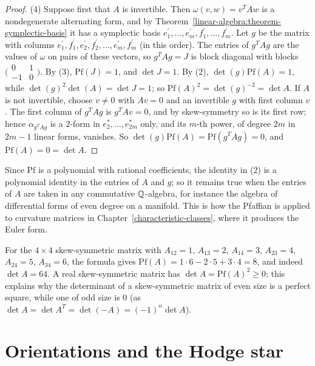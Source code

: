 \begin{proof}
(4) Suppose first that $A$ is invertible. Then $\omega(v, w) = v^TAw$ is a nondegenerate alternating form, and by Theorem~\ref{linear-algebra:theorem-symplectic-basis} it has a
symplectic basis $e_1^{\prime}, \ldots, e_m^{\prime}, f_1^{\prime}, \ldots, f_m^{\prime}$. Let $g$ be the matrix with columns $e_1^{\prime}, f_1^{\prime}, e_2^{\prime}, f_2^{\prime}, \ldots, e_m^{\prime}, f_m^{\prime}$
(in this order). The entries of $g^TAg$ are the values of $\omega$ on pairs of these vectors, so $g^TAg = J$ is block diagonal with blocks
$\bigl(\begin{smallmatrix} 0 & 1\\ -1 & 0\end{smallmatrix}\bigr)$. By (3), $\mathrm{Pf}(J) = 1$, and $\det J = 1$. By (2), $\det(g)\mathrm{Pf}(A) = 1$, while $\det(g)^2\det(A) = \det J = 1$;
so $\mathrm{Pf}(A)^2 = \det(g)^{-2} = \det A$. If $A$ is not invertible, choose $v \neq 0$ with $Av = 0$ and an invertible $g$ with first column $v$. The first column of $g^TAg$ is
$g^TAv = 0$, and by skew-symmetry so is its first row; hence $\alpha_{g^TAg}$ is a $2$-form in $e_2^*, \ldots, e_{2m}^*$ only, and its $m$-th power, of degree $2m$ in $2m - 1$ linear
forms, vanishes. So $\det(g)\mathrm{Pf}(A) = \mathrm{Pf}(g^TAg) = 0$, and $\mathrm{Pf}(A) = 0 = \det A$.
\end{proof}

Since $\mathrm{Pf}$ is a polynomial with rational coefficients, the identity in (2) is a polynomial identity in the entries of $A$ and $g$; so it remains true when the entries
of $A$ are taken in any commutative $\mathbb{Q}$-algebra, for instance the algebra of differential forms of even degree on a manifold. This is how the Pfaffian is applied to curvature
matrices in Chapter~\ref{characteristic-classes}, where it produces the Euler form.

\begin{example}\label{multilinear-algebra:example-pfaffian}
For the $4 \times 4$ skew-symmetric matrix with $A_{12} = 1$, $A_{13} = 2$, $A_{14} = 3$, $A_{23} = 4$, $A_{24} = 5$, $A_{34} = 6$, the formula gives
$\mathrm{Pf}(A) = 1 \cdot 6 - 2 \cdot 5 + 3 \cdot 4 = 8$, and indeed $\det A = 64$. A real skew-symmetric matrix has $\det A = \mathrm{Pf}(A)^2 \geq 0$; this explains why the
determinant of a skew-symmetric matrix of even size is a perfect square, while one of odd size is $0$ (as $\det A = \det A^T = \det(-A) = (-1)^n\det A$).
\end{example}

\section{Orientations and the Hodge star}\label{multilinear-algebra:section-hodge-star}

